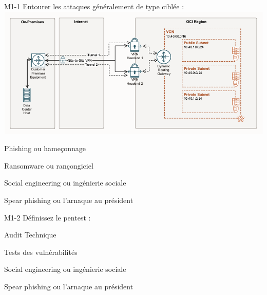 

 	
\begin{multi}[multiple=true]{M1-1}
	Entourer les attaques généralement de type  ciblée :\\
	\includegraphics[scale=0.5]{../Latex/Sources/EDU/SRC2/Quizz/pictures/image.png}
	
\item 	Phishing ou hameçonnage
\item 	Ransomware ou rançongiciel
\item* 	Social engineering ou ingénierie sociale
\item* 	Spear phishing ou l'arnaque au président
\end{multi}

\begin{multi}[multiple=true]{M1-2}
	Définissez le pentest :
\item*	Audit Technique
\item*	Tests des vulnérabilités
\item 	Social engineering ou ingénierie sociale
\item 	Spear phishing ou l'arnaque au président
\end{multi}
   	
